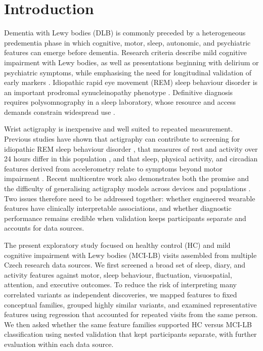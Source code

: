 \documentclass[referee,pdflatex,sn-vancouver-num]{sn-jnl}
\begin{document}

\maketitle

\section{Introduction}\label{sec:introduction}

Dementia with Lewy bodies (DLB) is commonly preceded by a heterogeneous
predementia phase in which cognitive, motor, sleep, autonomic, and psychiatric
features can emerge before dementia. Research criteria describe mild cognitive
impairment with Lewy bodies, as well as presentations beginning with delirium
or psychiatric symptoms, while emphasising the need for longitudinal validation of early
markers \cite{mckeith2020prodromal}. Idiopathic rapid eye movement (REM) sleep
behaviour disorder is an important prodromal synucleinopathy phenotype
\cite{postuma2019risk}. Definitive diagnosis requires polysomnography in a
sleep laboratory, whose resource and access demands constrain widespread
use \cite{zhou2025multicenter}.

Wrist actigraphy is inexpensive and well suited to repeated
measurement. Previous studies have shown that actigraphy can contribute to
screening for idiopathic REM sleep behaviour disorder \cite{zhou2025multicenter, stefani2018screening},
that measures of rest and activity over 24 hours differ in this population
\cite{winer2023restactivity}, and that sleep, physical activity, and circadian
features derived from accelerometry relate to symptoms beyond motor impairment
\cite{ophey2025accelerometry}. Recent multicentre work also demonstrates both
the promise and the difficulty of generalising actigraphy models across devices
and populations \cite{zhou2025multicenter}. Two issues therefore need to be
addressed together: whether engineered wearable features have clinically
interpretable associations, and whether diagnostic performance remains credible
when validation keeps participants separate and accounts for data sources.

The present exploratory study focused on healthy control (HC) and mild
cognitive impairment with Lewy bodies (MCI-LB) visits assembled from multiple
Czech research data sources. We first screened a broad set of sleep, diary, and activity features
against motor, sleep behaviour, fluctuation, visuospatial, attention, and
executive outcomes. To reduce the risk of interpreting many correlated
variants as independent discoveries, we mapped features to fixed conceptual
families, grouped highly similar variants, and examined representative
features using regression that accounted for repeated visits from the same person.
We then asked whether the same
feature families supported HC versus MCI-LB classification using nested
validation that kept participants separate, with further evaluation within each data source.
\end{document}
